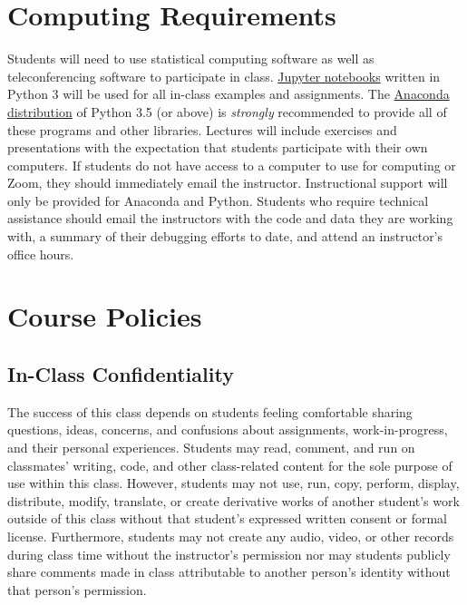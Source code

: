 \documentclass[10pt]{memoir}
\begin{document}
\section{\textbf{Computing Requirements}}
Students will need to use statistical computing software as well as teleconferencing software to participate in class. \href{http://jupyter.org/}{Jupyter notebooks} written in Python 3 will be used for all in-class examples and assignments. The \href{https://www.continuum.io/why-anaconda}{Anaconda distribution} of Python 3.5 (or above) is \textit{strongly} recommended to provide all of these programs and other libraries. Lectures will include exercises and presentations with the expectation that students participate with their own computers. If students do not have access to a computer to use for computing or Zoom, they should immediately email the instructor. Instructional support will only be provided for Anaconda and Python. Students who require technical assistance should email the instructors with the code and data they are working with, a summary of their debugging efforts to date, and attend an instructor's office hours.


\section{Course Policies}


\subsection{In-Class Confidentiality}
The success of this class depends on students feeling comfortable sharing questions, ideas, concerns, and confusions about assignments, work-in-progress, and their personal experiences. Students may read, comment, and run on classmates' writing, code, and other class-related content for the sole purpose of use within this class. However, students may not use, run, copy, perform, display, distribute, modify, translate, or create derivative works of another student's work outside of this class without that student's expressed written consent or formal license. Furthermore, students may not create any audio, video, or other records during class time without the instructor's permission nor may students publicly share comments made in class attributable to another person's identity without that person's permission.
\end{document}
